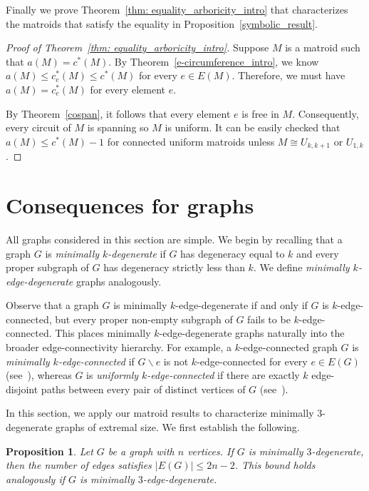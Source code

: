 \documentclass{amsart}
\newcommand{\ba}{\backslash}
\newtheorem{proposition}[theorem]{Proposition}
\theoremstyle{definition}
\theoremstyle{remark}
\numberwithin{equation}{section}
\begin{document}
Finally we prove Theorem~\ref{thm: equality_arboricity_intro} that characterizes the matroids that satisfy the equality in Proposition~\ref{symbolic_result}.

\begin{proof}[Proof of Theorem~\ref{thm: equality_arboricity_intro}]
Suppose $M$ is a matroid such that $a(M) = c^*(M)$. By Theorem~\ref{e-circumference_intro}, we know $a(M) \le c_e^*(M) \le c^*(M)$ for every $e \in E(M)$. Therefore, we must have $a(M) = c_e^*(M)$ for every element $e$. 

By Theorem~\ref{cospan}, it follows that every element $e$ is free in $M$. Consequently, every circuit of $M$ is spanning so $M$ is uniform. It can be easily checked that $a(M) \leq c^*(M)-1$ for connected uniform matroids unless $M \cong U_{k,k+1}$ or $U_{1,k}$.
\end{proof}







\section{Consequences for graphs}\label{sec: graphs}
All graphs considered in this section are simple. We begin by recalling that a graph $G$ is \textit{minimally $k$-degenerate} if $G$ has degeneracy equal to $k$ and every proper subgraph of $G$ has degeneracy strictly less than $k$. We define \textit{minimally $k$-edge-degenerate} graphs analogously. 

Observe that a graph $G$ is minimally $k$-edge-degenerate if and only if $G$ is $k$-edge-connected, but every proper non-empty subgraph of $G$ fails to be $k$-edge-connected. This places minimally $k$-edge-degenerate graphs naturally into the broader edge-connectivity hierarchy. For example, a $k$-edge-connected graph $G$ is \textit{minimally $k$-edge-connected} if $G \ba e$ is not $k$-edge-connected for every $e \in E(G)$ (see~\cite{maurer1978}), whereas $G$ is \textit{uniformly $k$-edge-connected} if there are exactly $k$ edge-disjoint paths between every pair of distinct vertices of $G$ (see~\cite{goring2022, kingsford2025, xu2026}).



In this section, we apply our matroid results to characterize minimally $3$-degenerate graphs of extremal size. We first establish the following.

\begin{proposition}
\label{prop: min_3_degen_graphs}
Let $G$ be a graph with $n$ vertices. If $G$ is minimally $3$-degenerate, then the number of edges satisfies $|E(G)| \le 2n - 2$. This bound holds analogously if $G$ is minimally $3$-edge-degenerate.
\end{proposition}
\end{document}
